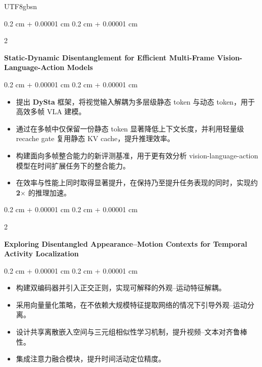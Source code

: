 \documentclass[10pt, letterpaper]{article}
\newenvironment{highlights}{
    \begin{itemize}[
        topsep=0.10 cm,
        parsep=0.10 cm,
        partopsep=0pt,
        itemsep=0pt,
        leftmargin=0.4 cm + 10pt
    ]
}{
    \end{itemize}
} %
\newenvironment{onecolentry}{
    \begin{adjustwidth}{
        0.2 cm + 0.00001 cm
    }{
        0.2 cm + 0.00001 cm
    }
}{
    \end{adjustwidth}
} %
\newenvironment{twocolentry}[2][]{
    \onecolentry
    \def\secondColumn{#2}
    \setcolumnwidth{\fill, 4.5 cm}
    \begin{paracol}{2}
}{
    \switchcolumn \raggedleft \secondColumn
    \end{paracol}
    \endonecolentry
} %
\begin{document}
\begin{CJK*}{UTF8}{gbsn}
\vspace{0.2 cm}

\begin{twocolentry}{}
    \begin{minipage}[t]{\textwidth}
        \justifying
        \textbf{Static-Dynamic Disentanglement for Efficient Multi-Frame Vision-Language-Action Models}
    \end{minipage}
\end{twocolentry}

\vspace{0.10 cm}
\begin{onecolentry}
    \begin{highlights}
        \item 提出 \textbf{DySta} 框架，将视觉输入解耦为多层级静态 token 与动态 token，用于高效多帧 VLA 建模。
        \item 通过在多帧中仅保留一份静态 token 显著降低上下文长度，并利用轻量级 recache gate 复用静态 KV cache，提升推理效率。
        \item 构建面向多帧整合能力的新评测基准，用于更有效分析 vision-language-action 模型在时间扩展任务下的整合能力。
        \item 在效率与性能上同时取得显著提升，在保持乃至提升任务表现的同时，实现约 \textbf{2$\times$} 的推理加速。
    \end{highlights}
\end{onecolentry}

\vspace{0.2 cm}

\begin{twocolentry}{}
    \begin{minipage}[t]{\textwidth}
        \justifying
        \textbf{Exploring Disentangled Appearance--Motion Contexts for Temporal Activity Localization}
    \end{minipage}
\end{twocolentry}

\vspace{0.10 cm}
\begin{onecolentry}
    \begin{highlights}
        \item 构建双编码器并引入正交正则，实现可解释的外观--运动特征解耦。
        \item 采用向量量化策略，在不依赖大规模特征提取网络的情况下引导外观--运动分离。
        \item 设计共享离散嵌入空间与三元组相似性学习机制，提升视频--文本对齐鲁棒性。
        \item 集成注意力融合模块，提升时间活动定位精度。
    \end{highlights}
\end{onecolentry}


\end{CJK*}
\end{document}
